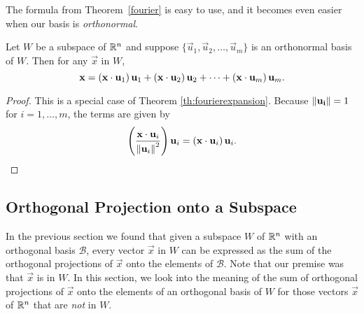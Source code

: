 \documentclass{ximera}
\begin{document}
The formula from Theorem~\ref{fourier} is easy to use, and it becomes even easier when our basis is \emph{orthonormal}.

\begin{corollary}\label{cor:orthonormal}
Let $W$ be a subspace of $\mathbb{R}^n$ and suppose $\{ \vec{u}_1, \vec{u}_2, \ldots, \vec{u}_m \}$
is an orthonormal basis of $W$.
Then for any $\vec{x}$ in $W$,
\[ \mathbf{x} =
\left(\mathbf{x}\cdot \mathbf{u}_1\right) \mathbf{u}_1 +
\left(\mathbf{x}\cdot \mathbf{u}_2\right) \mathbf{u}_2 +
\cdots +
\left(\mathbf{x}\cdot \mathbf{u}_m\right)  \mathbf{u}_m.
\]
\end{corollary}
\begin{proof}
This is a special case of Theorem \ref{th:fourierexpansion}.  Because $\left\lVert\mathbf{u_i}\right\rVert = 1$ for $i=1,\ldots,m$, %
the terms are given by 
$$\left(\frac{\mathbf{x}\cdot \mathbf{u}_i}{\left\lVert\mathbf{u}_i\right\rVert^2}\right)\mathbf{u}_i=\left(\mathbf{x}\cdot \mathbf{u}_i\right) \mathbf{u}_i.$$

\end{proof}

\subsection*{Orthogonal Projection onto a Subspace}
In the previous section we found that given a subspace $W$ of $\mathbb{R}^n$ with an orthogonal basis $\mathcal{B}$, every vector $\vec{x}$ in $W$ can be expressed as the sum of the orthogonal projections of $\vec{x}$ onto the elements of $\mathcal{B}$.  Note that our premise was that $\vec{x}$ is in $W$.  In this section, we look into the meaning of the sum of orthogonal projections of $\vec{x}$ onto the elements of an orthogonal basis of $W$ for those vectors $\vec{x}$ of $\mathbb{R}^n$ that are \emph{not} in $W$.
\end{document}

